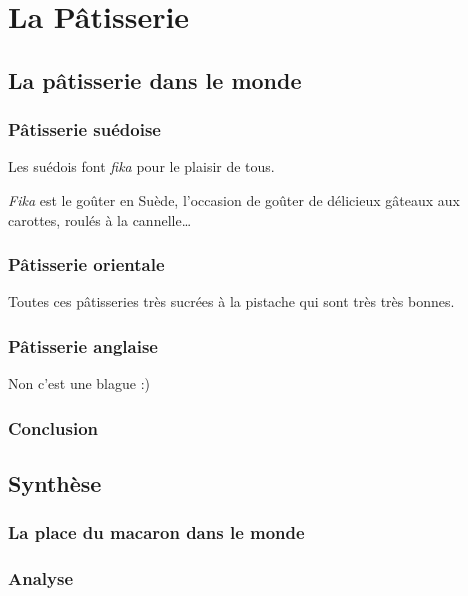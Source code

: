 
\chapter{La Pâtisserie}
\label{chap:patisserie}





\section{La pâtisserie dans le monde}


\subsection{Pâtisserie suédoise}
Les suédois font \emph{fika} pour le plaisir de tous.

\begin{definition}[Fika]
  \emph{Fika} est le goûter en Suède, l'occasion de goûter de délicieux gâteaux aux carottes, roulés à la cannelle\dots
\end{definition}

\subsection{Pâtisserie orientale}
Toutes ces pâtisseries très sucrées à la pistache qui sont très très bonnes.

\subsection{Pâtisserie anglaise}
Non c'est une blague :) \cite{F2011}

\subsection{Conclusion}

\section{Synthèse}


\subsection{La place du macaron dans le monde}

\subsection{Analyse}
